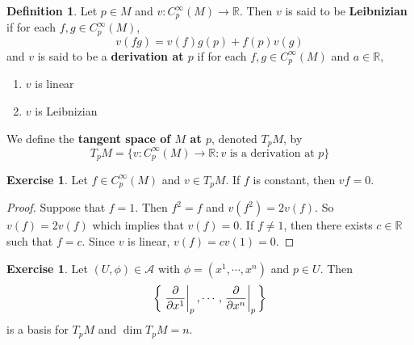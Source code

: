 \documentclass[12pt]{amsart}
\theoremstyle{definition}
\newtheorem{defn}[definition]{Definition}
\newtheorem{ex}[definition]{Exercise}
\newcommand{\R}{\mathbb{R}}
\newcommand{\MA}{\mathcal{A}}
\begin{document}
	\begin{defn}
		Let $p \in M$ and $v: C^{\infty}_p(M) \rightarrow \R$. Then $v$ is said to be \textbf{Leibnizian} if for each $f,g \in  C^{\infty}_p(M)$, $$v(fg) = v(f)g(p) + f(p)v(g)$$ and $v$ is said to be a \textbf{derivation at $p$} if for each $f, g \in C^{\infty}_p(M)$ and $a \in \R$,
		\begin{enumerate}
			\item $v$ is linear 
			\item $v$ is Leibnizian
		\end{enumerate}
		We define the \textbf{tangent space of $M$ at $p$}, denoted $T_pM$, by $$T_pM = \{ v: C^{\infty}_p(M) \rightarrow \R: v \text{ is a derivation at }p\}$$
	\end{defn}

	\begin{ex}
		Let $f \in C^{\infty}_p(M)$ and $v \in T_pM$. If $f$ is constant, then $vf = 0$.
	\end{ex}

	\begin{proof}
		Suppose that $f = 1$. Then $f^2 = f$ and $v(f^2) = 2v(f)$. So $v(f) = 2v(f)$ which implies that $v(f) = 0$. If $f \neq 1$, then there exists $c \in \R$ such that $f = c$. Since $v$ is linear, $v(f) = cv(1) = 0$.
	\end{proof}

	\begin{ex}
		Let $(U, \phi) \in \MA$ with $\phi = (x^1, \cdots, x^n)$ and $p \in U$. Then $$ \bigg \{\eval{\pdv{x^1}}_{p}, \cdots, \eval{\pdv{x^n}}_{p} \bigg \}$$ is a basis for $T_pM$ and $\dim T_pM = n$.
	\end{ex}
\end{document}
